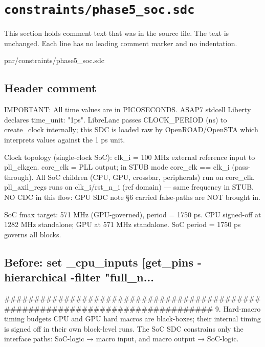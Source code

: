 \section{\texttt{constraints/phase5\_soc.sdc}}\label{tm:pd:phase5-soc-sdc}

This section holds comment text that was in the source file. The text is unchanged. Each line has no leading comment marker and no indentation.

\begin{relocated}{pnr/constraints/phase5_soc.sdc}

\subsection*{Header comment}

\begin{textblock}

IMPORTANT: All time values are in PICOSECONDS.
ASAP7 stdcell Liberty declares time_unit: "1ps".
LibreLane passes CLOCK_PERIOD (ns) to create_clock internally; this SDC is
loaded raw by OpenROAD/OpenSTA which interprets values against the 1 ps unit.

Clock topology (single-clock SoC):
  clk_i  = 100 MHz external reference input to pll_clkgen.
  core_clk = PLL output; in STUB mode core_clk == clk_i (pass-through).
  All SoC children (CPU, GPU, crossbar, peripherals) run on core_clk.
  pll_axil_regs runs on clk_i/rst_n_i (ref domain) — same frequency in STUB.
  NO CDC in this flow: GPU SDC note §6 carried false-paths are NOT brought in.

SoC fmax target: 571 MHz (GPU-governed), period = 1750 ps.
CPU signed-off at 1282 MHz standalone; GPU at 571 MHz standalone.
SoC period = 1750 ps governs all blocks.
\end{textblock}

\subsection*{Before: set \_cpu\_inputs  [get\_pins -hierarchical -filter "full\_n...}

\begin{textblock}
##############################################################################
9. Hard-macro timing budgets
   CPU and GPU hard macros are black-boxes; their internal timing is signed off
   in their own block-level runs.  The SoC SDC constrains only the interface
   paths:  SoC-logic → macro input, and macro output → SoC-logic.


\end{textblock}
\end{relocated}
